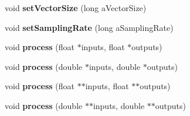 \begin{DoxyCompactItemize}
\item 
\hypertarget{class_ambisonic3_d_a0da0abc4a0036f369bd84a926ac3734c}{void {\bfseries set\-Vector\-Size} (long a\-Vector\-Size)}\label{class_ambisonic3_d_a0da0abc4a0036f369bd84a926ac3734c}

\item 
\hypertarget{class_ambisonic3_d_a5e7467dbba7233317954b4ed8607174c}{void {\bfseries set\-Sampling\-Rate} (long a\-Sampling\-Rate)}\label{class_ambisonic3_d_a5e7467dbba7233317954b4ed8607174c}

\item 
\hypertarget{class_ambisonic3_d_af5e2e2ed735b2746c5f4a27867bb2459}{void {\bfseries process} (float $\ast$inputs, float $\ast$outputs)}\label{class_ambisonic3_d_af5e2e2ed735b2746c5f4a27867bb2459}

\item 
\hypertarget{class_ambisonic3_d_ae7280e883920d813914e5acdd40139c3}{void {\bfseries process} (double $\ast$inputs, double $\ast$outputs)}\label{class_ambisonic3_d_ae7280e883920d813914e5acdd40139c3}

\item 
\hypertarget{class_ambisonic3_d_a1e0bf1a4a9c40c7b8f576976532a94d3}{void {\bfseries process} (float $\ast$$\ast$inputs, float $\ast$$\ast$outputs)}\label{class_ambisonic3_d_a1e0bf1a4a9c40c7b8f576976532a94d3}

\item 
\hypertarget{class_ambisonic3_d_af678e023c64b3865ef27fe29bcc4a0ca}{void {\bfseries process} (double $\ast$$\ast$inputs, double $\ast$$\ast$outputs)}\label{class_ambisonic3_d_af678e023c64b3865ef27fe29bcc4a0ca}

\end{DoxyCompactItemize}
